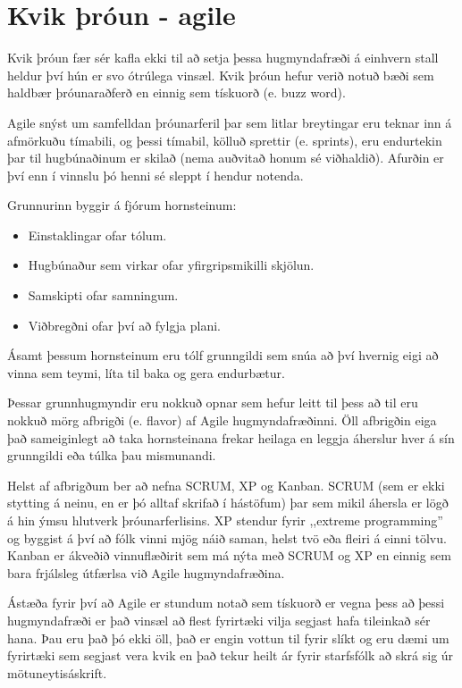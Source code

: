 \section{Kvik þróun - agile}
Kvik þróun fær sér kafla ekki til að setja þessa hugmyndafræði á einhvern stall heldur því hún er svo ótrúlega vinsæl.
Kvik þróun hefur verið notuð bæði sem haldbær þróunaraðferð en einnig sem tískuorð (e. buzz word).

Agile snýst um samfelldan þróunarferil þar sem litlar breytingar eru teknar inn á afmörkuðu tímabili, og þessi tímabil, kölluð sprettir (e. sprints), eru endurtekin þar til hugbúnaðinum er skilað (nema auðvitað honum sé viðhaldið).
Afurðin er því enn í vinnslu þó henni sé sleppt í hendur notenda.

Grunnurinn byggir á fjórum hornsteinum:
\begin{itemize}
	\item Einstaklingar ofar tólum.
	\item Hugbúnaður sem virkar ofar yfirgripsmikilli skjölun.
	\item Samskipti ofar samningum.
	\item Viðbregðni ofar því að fylgja plani.
\end{itemize}

Ásamt þessum hornsteinum eru tólf grunngildi sem snúa að því hvernig eigi að vinna sem teymi, líta til baka og gera endurbætur.

Þessar grunnhugmyndir eru nokkuð opnar sem hefur leitt til þess að til eru nokkuð mörg afbrigði (e. flavor) af Agile hugmyndafræðinni.
Öll afbrigðin eiga það sameiginlegt að taka hornsteinana frekar heilaga en leggja áherslur hver á sín grunngildi eða túlka þau mismunandi.

Helst af afbrigðum ber að nefna SCRUM, XP og Kanban.
SCRUM (sem er ekki stytting á neinu, en er þó alltaf skrifað í hástöfum) þar sem mikil áhersla er lögð á hin ýmsu hlutverk þróunarferlisins.
XP stendur fyrir ,,extreme programming'' og byggist á því að fólk vinni mjög náið saman, helst tvö eða fleiri á einni tölvu.
Kanban er ákveðið vinnuflæðirit sem má nýta með SCRUM og XP en einnig sem bara frjálsleg útfærlsa við Agile hugmyndafræðina.

Ástæða fyrir því að Agile er stundum notað sem tískuorð er vegna þess að þessi hugmyndafræði er það vinsæl að flest fyrirtæki vilja segjast hafa tileinkað sér hana.
Þau eru það þó ekki öll, það er engin vottun til fyrir slíkt og eru dæmi um fyrirtæki sem segjast vera kvik en það tekur heilt ár fyrir starfsfólk að skrá sig úr mötuneytisáskrift.

